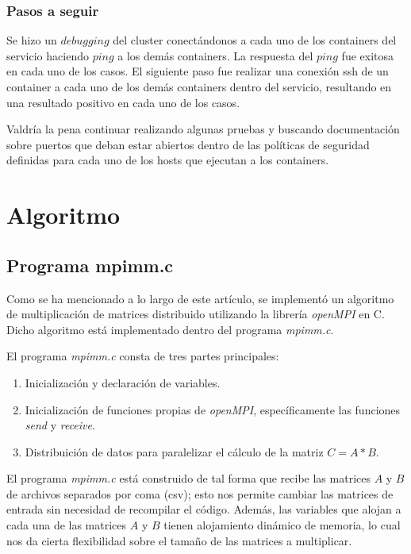\documentclass[DIV=calc, paper=letter, fontsize=11pt, twocolumn]{scrartcl}
\begin{document}
\subsubsection{Pasos a seguir}

Se hizo un $debugging$ del cluster conectándonos a cada uno de los containers del servicio haciendo $ping$ a los demás containers. La respuesta del $ping$ fue exitosa en cada uno de los casos. El siguiente paso fue realizar una conexión ssh de un container a cada uno de los demás containers dentro del servicio, resultando en una resultado positivo en cada uno de los casos.

Valdría la pena continuar realizando algunas pruebas y buscando documentación sobre puertos que deban estar abiertos dentro de las políticas de seguridad definidas para cada uno de los hosts que ejecutan a los containers.

\section{Algoritmo}

\subsection{Programa mpimm.c}

Como se ha mencionado a lo largo de este artículo, se implementó un algoritmo de multiplicación de matrices distribuido utilizando la librería \textit{openMPI} en C. Dicho algoritmo está implementado dentro del programa \textit{mpimm.c}.

El programa \textit{mpimm.c} consta de tres partes principales:

\begin{enumerate}
    \item Inicialización y declaración de variables.
    \item Inicialización de funciones propias de \textit{openMPI}, específicamente las funciones \textit{send} y \textit{receive}.
    \item Distribuición de datos para paralelizar el cálculo de la matriz $C = A * B$.
\end{enumerate}

El programa \textit{mpimm.c} está construido de tal forma que recibe las matrices $A$ y $B$ de archivos separados por coma (csv); esto nos permite cambiar las matrices de entrada sin necesidad de recompilar el código. Además, las variables que alojan a cada una de las matrices $A$ y $B$ tienen alojamiento dinámico de memoria, lo cual nos da cierta flexibilidad sobre el tamaño de las matrices a multiplicar.
\end{document}
